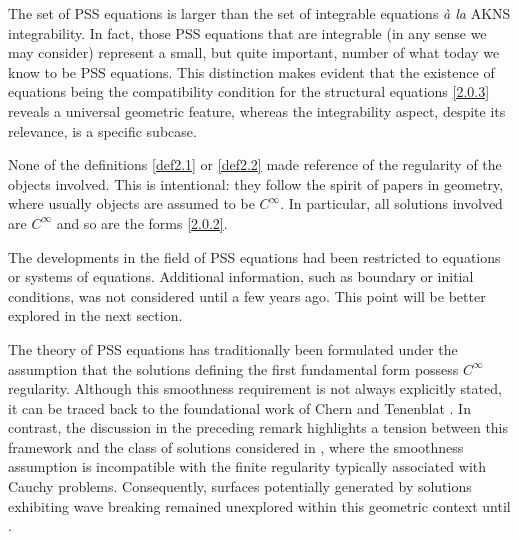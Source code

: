 \documentclass{cimart}
\begin{document}
\begin{remark}
 The set of PSS equations is larger than the set of integrable equations {\it à la} AKNS integrability. In fact, those PSS equations that are integrable (in any sense we may consider) represent a small, but quite important, number of what today we know to be PSS equations. This distinction makes evident that the existence of equations being the compatibility condition for the structural equations \eqref{2.0.3} reveals a universal geometric feature, whereas the integrability aspect, despite its relevance, is a specific subcase. 
 \end{remark}

\begin{remark}
 None of the definitions \ref{def2.1} or \ref{def2.2} made reference of the regularity of the objects involved. This is intentional: they follow the spirit of papers in geometry, where usually objects are assumed to be $C^\infty$. In particular, all solutions involved are $C^\infty$ and so are the forms \eqref{2.0.2}.
\end{remark}

\begin{remark}
The developments in the field of PSS equations had been restricted to equations or systems of equations. Additional information, such as boundary or initial conditions, was not considered until a few years ago. This point will be better explored in the next section.
\end{remark}

\begin{remark}
The theory of PSS equations has traditionally been formulated under the assumption that the solutions defining the first fundamental form possess $C^\infty$ regularity. Although this smoothness requirement is not always explicitly stated, it can be traced back to the foundational work of Chern and Tenenblat \cite[page 55, second paragraph]{chern}. In contrast, the discussion in the preceding remark highlights a tension between this framework and the class of solutions considered in \cite{const1998-1,const1998-2,const2000-1}, where the smoothness assumption is incompatible with the finite regularity typically associated with Cauchy problems. Consequently, surfaces potentially generated by solutions exhibiting wave breaking remained unexplored within this geometric context until \cite{freire-ch}. 
\end{remark}
\end{document}
